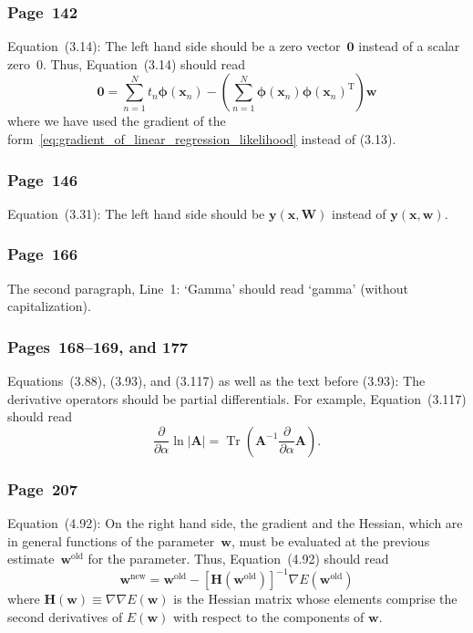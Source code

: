\documentclass[12pt,a4paper]{article}
\newcommand{\erratum}[1]{\subsubsection*{#1}}
\begin{document}
\erratum{Page~142}
Equation~(3.14):
The left hand side should be a zero vector~$\mathbf{0}$ instead of a scalar zero~$0$.
Thus, Equation~(3.14) should read
\begin{equation}
\mathbf{0} =
\sum_{n=1}^{N} t_n \bm{\phi}\left( \mathbf{x}_n \right)
- \left( \sum_{n=1}^{N}
\bm{\phi}\left(\mathbf{x}_n\right)\bm{\phi}\left(\mathbf{x}_n\right)^{\operatorname{T}} \right)
\mathbf{w}
\end{equation}
where we have used the gradient of the form~\eqref{eq:gradient_of_linear_regression_likelihood}
instead of (3.13).

\erratum{Page~146}
Equation~(3.31):
The left hand side should be $\mathbf{y}\left(\mathbf{x}, \mathbf{W}\right)$ instead of
$\mathbf{y}\left(\mathbf{x}, \mathbf{w}\right)$.

\erratum{Page~166}
The second paragraph, Line~1:
`Gamma' should read `gamma' (without capitalization).

\erratum{Pages~168--169, and 177}
Equations~(3.88), (3.93), and (3.117) as well as the text before (3.93):
The derivative operators should be partial differentials.
For example, Equation~(3.117) should read
\begin{equation}
\frac{\partial}{\partial \alpha} \ln \left| \mathbf{A} \right| =
\operatorname{Tr}\left( \mathbf{A}^{-1} \frac{\partial}{\partial \alpha} \mathbf{A} \right) .
\end{equation}

\erratum{Page~207}
Equation~(4.92):
On the right hand side, the gradient and the Hessian,
which are in general functions of the parameter~$\mathbf{w}$,
must be evaluated at the previous estimate~$\mathbf{w}^{\text{old}}$ for the parameter.
Thus, Equation~(4.92) should read
\begin{equation}
\mathbf{w}^{\text{new}} = \mathbf{w}^{\text{old}} -
  \left[ \mathbf{H} \left( \mathbf{w}^{\text{old}} \right) \right]^{-1}
  \nabla E \left( \mathbf{w}^{\text{old}} \right)
\end{equation}
where $\mathbf{H}\left(\mathbf{w}\right) \equiv \nabla\nabla E\left(\mathbf{w}\right)$ is
the Hessian matrix whose elements comprise the second derivatives of $E\left(\mathbf{w}\right)$
with respect to the components of $\mathbf{w}$.
\end{document}
